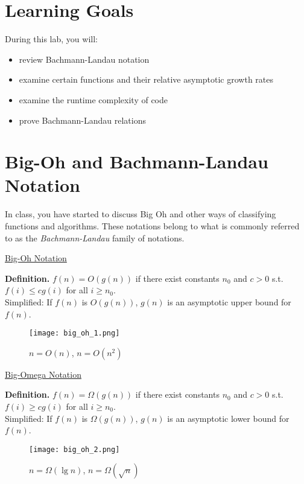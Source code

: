 


\section*{Learning Goals}
During this lab, you will:
\begin{itemize}
    \item review Bachmann-Landau notation
    \item examine certain functions and their relative asymptotic growth rates
    \item examine the runtime complexity of code
    \item prove Bachmann-Landau relations
\end{itemize}

\section*{Big-Oh and Bachmann-Landau Notation}

In class, you have started to discuss Big Oh and other ways of classifying functions and algorithms. These notations belong to what is commonly referred to as the \textit{Bachmann-Landau} family of notations.
    
\begin{framed}\relax
    \begin{center}\relax
        \underline{Big-Oh Notation}
    \end{center}
    \textbf{Definition.} $f(n) = O(g(n))$ if there exist constants $n_0$ and $c > 0$ s.t. $f(i) \leq c g(i)$ for all $i \geq n_0$.\\

    Simplified: If $f(n)$ is $O(g(n))$, $g(n)$ is an asymptotic upper bound for $f(n)$.
\end{framed}
\begin{figure}[h]
    \centering
    \texttt{[image: big\_oh\_1.png]}
    \caption*{$n = O(n)$, $n = O(n^2)$}
\end{figure}

\begin{framed}
    \begin{center}
        \underline{Big-Omega Notation}
    \end{center}
    \textbf{Definition.} $f(n) = \Omega(g(n))$ if there exist constants $n_0$ and $c > 0$ s.t. $f(i) \geq c g(i)$ for all $i \geq n_0$.\\

    Simplified: If $f(n)$ is $\Omega(g(n))$, $g(n)$ is an asymptotic lower bound for $f(n)$.
\end{framed}
\begin{figure}[h]
    \centering
    \texttt{[image: big\_oh\_2.png]}
    \caption*{$n = \Omega(\lg n)$, $n = \Omega(\sqrt{n})$}
\end{figure}

